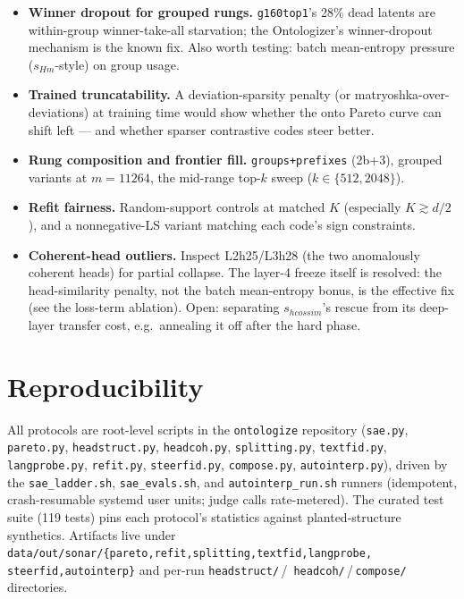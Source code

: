 \documentclass[11pt]{article}
\begin{document}
\begin{itemize}
onto-trained-on-the-tail asymmetry; upgrades every table.
\item \textbf{Winner dropout for grouped rungs.} \texttt{g160top1}'s
28\% dead latents are within-group winner-take-all starvation; the
Ontologizer's winner-dropout mechanism is the known fix. Also worth
testing: batch mean-entropy pressure ($s_{Hm}$-style) on group usage.
\item \textbf{Trained truncatability.} A deviation-sparsity penalty (or
matryoshka-over-deviations) at training time would show whether the onto
Pareto curve can shift left --- and whether sparser contrastive codes
steer better.
\item \textbf{Rung composition and frontier fill.} \texttt{groups+prefixes}
(2b+3), grouped variants at $m{=}11264$, the mid-range top-$k$ sweep
($k \in \{512, 2048\}$).
\item \textbf{Refit fairness.} Random-support controls at matched $K$
(especially $K \gtrsim d/2$), and a nonnegative-LS variant matching each
code's sign constraints.
\item \textbf{Coherent-head outliers.} Inspect L2h25/L3h28 (the two
anomalously coherent heads) for partial collapse. The layer-4 freeze
itself is resolved: the head-similarity penalty, not the batch
mean-entropy bonus, is the effective fix (see the loss-term ablation).
Open: separating $s_{hcossim}$'s rescue from its deep-layer transfer
cost, e.g.\ annealing it off after the hard phase.
\end{itemize}

\section*{Reproducibility}

All protocols are root-level scripts in the \texttt{ontologize}
repository (\texttt{sae.py}, \texttt{pareto.py}, \texttt{headstruct.py},
\texttt{headcoh.py}, \texttt{splitting.py}, \texttt{textfid.py},
\texttt{langprobe.py}, \texttt{refit.py}, \texttt{steerfid.py},
\texttt{compose.py}, \texttt{autointerp.py}), driven by the \texttt{sae\_ladder.sh},
\texttt{sae\_evals.sh}, and \texttt{autointerp\_run.sh} runners
(idempotent, crash-resumable systemd user units; judge calls
rate-metered). The curated test suite (119 tests) pins each protocol's
statistics against planted-structure synthetics. Artifacts live under
\texttt{data/out/sonar/\{pareto,refit,splitting,textfid,langprobe,
steerfid,autointerp\}} and per-run \texttt{headstruct/}\,/\,%
\texttt{headcoh/}\,/\,\texttt{compose/} directories.
\end{document}

